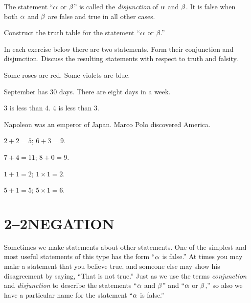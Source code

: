 \documentclass[11pt]{book}
\begin{document}
\begin{definition}
The statement ``$\alpha$ or $\beta$'' is called the \emph{disjunction} of $\alpha$ and
$\beta$. It is false when both $\alpha$ and $\beta$ are false and true in all other
cases.
\end{definition}

\begin{IIproblem}
Construct the truth table for the statement ``$\alpha$ or $\beta$.''
\end{IIproblem}


In each exercise below there are two statements. Form their conjunction and
disjunction. Discuss the resulting statements with respect to truth and falsity.

\begin{exercisecols}
\begin{exlist}
\item Some roses are red. Some violets are blue.
\item September has 30 days. There are eight days in a week.
\item 3 is less than 4. 4 is less than 3.
\item Napoleon was an emperor of Japan. Marco Polo discovered America.
\item $2 + 2 = 5$; \quad $6 + 3 = 9$.
\item $7 + 4 = 11$; \quad $8 + 0 = 9$.
\item $1 + 1 = 2$; \quad $1 \times 1 = 2$.
\item $5 + 1 = 5$; \quad $5 \times 1 = 6$.
\end{exlist}
\end{exercisecols}

\section*{2--2\quad NEGATION}

Sometimes we make statements about other statements. One of the simplest and most
useful statements of this type has the form ``$\alpha$ is false.'' At times you may
make a statement that you believe true, and someone else may show his
disagreement by saying, ``That is not true.'' Just as we use the terms
\emph{conjunction} and \emph{disjunction} to describe the statements ``$\alpha$ and
$\beta$'' and ``$\alpha$ or $\beta$,'' so also we have a particular name for the
statement ``$\alpha$ is false.''
\end{document}
